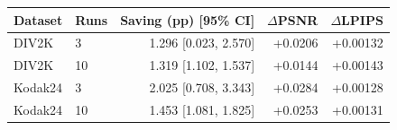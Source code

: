 \begin{tabular}{llrrr}
\toprule
Dataset & Runs & Saving (pp) [95\% CI] & $\Delta$PSNR & $\Delta$LPIPS \\
\midrule
DIV2K & 3 & 1.296 [0.023, 2.570] & +0.0206 & +0.00132 \\
DIV2K & 10 & 1.319 [1.102, 1.537] & +0.0144 & +0.00143 \\
Kodak24 & 3 & 2.025 [0.708, 3.343] & +0.0284 & +0.00128 \\
Kodak24 & 10 & 1.453 [1.081, 1.825] & +0.0253 & +0.00131 \\
\bottomrule
\end{tabular}
